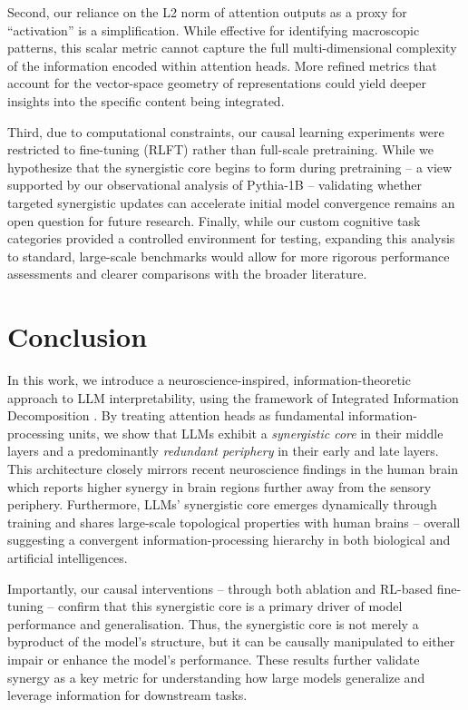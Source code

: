 \documentclass[11pt,a4paper]{ouparticle}
\begin{document}
Second, our reliance on the L2 norm of attention outputs as a proxy for ``activation'' is a simplification. While effective for identifying macroscopic patterns, this scalar metric cannot capture the full multi-dimensional complexity of the information encoded within attention heads. More refined metrics that account for the vector-space geometry of representations could yield deeper insights into the specific content being integrated.

Third, due to computational constraints, our causal learning experiments were restricted to fine-tuning (RLFT) rather than full-scale pretraining. While we hypothesize that the synergistic core begins to form during pretraining -- a view supported by our observational analysis of Pythia-1B -- validating whether targeted synergistic updates can accelerate initial model convergence remains an open question for future research. Finally, while our custom cognitive task categories provided a controlled environment for testing, expanding this analysis to standard, large-scale benchmarks would allow for more rigorous performance assessments and clearer comparisons with the broader literature.


\section*{Conclusion}\label{sec:conclusion}

In this work, we introduce a neuroscience-inspired, information-theoretic approach to LLM interpretability, using the framework of Integrated Information Decomposition \cite{phid2021}. By treating attention heads as fundamental information-processing units, we show that LLMs exhibit a \emph{synergistic core} in their middle layers and a predominantly \emph{redundant periphery} in their early and late layers. This architecture closely mirrors recent neuroscience findings in the human brain \cite{luppi2022synergistic} which reports higher synergy in brain regions further away from the sensory periphery. Furthermore, LLMs' synergistic core emerges dynamically through training and shares large-scale topological properties with human brains -- overall suggesting a convergent information-processing hierarchy in both biological and artificial intelligences.

Importantly, our causal interventions -- through both ablation and RL-based fine-tuning -- confirm that this synergistic core is a primary driver of model performance and generalisation. Thus, the synergistic core is not merely a byproduct of the model's structure, but it can be causally manipulated to either impair or enhance the model's performance.
These results further validate synergy as a key metric for understanding how large models generalize and leverage information for downstream tasks. 
\end{document}
